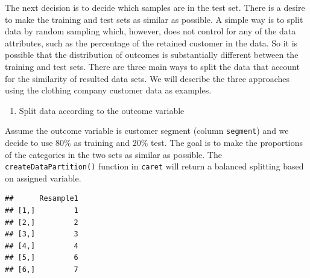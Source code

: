 \documentclass[12pt,]{krantz}
\makeatletter
\newenvironment{Shaded}{\begin{snugshade}}{\end{snugshade}}
\newcommand{\CommentTok}[1]{\textcolor[rgb]{0.37,0.37,0.37}{\textit{#1}}}
\newcommand{\DataTypeTok}[1]{\textcolor[rgb]{0.27,0.27,0.27}{#1}}
\newcommand{\DecValTok}[1]{\textcolor[rgb]{0.06,0.06,0.06}{#1}}
\newcommand{\FloatTok}[1]{\textcolor[rgb]{0.06,0.06,0.06}{#1}}
\newcommand{\KeywordTok}[1]{\textcolor[rgb]{0.27,0.27,0.27}{\textbf{#1}}}
\newcommand{\NormalTok}[1]{#1}
\newcommand{\OperatorTok}[1]{\textcolor[rgb]{0.43,0.43,0.43}{\textbf{#1}}}
\newcommand{\OtherTok}[1]{\textcolor[rgb]{0.37,0.37,0.37}{#1}}
\newcommand{\StringTok}[1]{\textcolor[rgb]{0.5,0.5,0.5}{#1}}
\providecommand{\tightlist}{%
  \setlength{\itemsep}{0pt}\setlength{\parskip}{0pt}}
\newenvironment{kframe}{%
\medskip{}
\setlength{\fboxsep}{.8em}
 \def\at@end@of@kframe{}%
 \ifinner\ifhmode%
  \def\at@end@of@kframe{\end{minipage}}%
  \begin{minipage}{\columnwidth}%
 \fi\fi%
 \def\FrameCommand##1{\hskip\@totalleftmargin \hskip-\fboxsep
 \colorbox{shadecolor}{##1}\hskip-\fboxsep
     \hskip-\linewidth \hskip-\@totalleftmargin \hskip\columnwidth}%
 \MakeFramed {\advance\hsize-\width
   \@totalleftmargin\z@ \linewidth\hsize
   \@setminipage}}%
 {\par\unskip\endMakeFramed%
 \at@end@of@kframe}
\renewenvironment{Shaded}{\begin{kframe}}{\end{kframe}}
\makeatother
\begin{document}
The next decision is to decide which samples are in the test set. There is a desire to make the training and test sets as similar as possible. A simple way is to split data by random sampling which, however, does not control for any of the data attributes, such as the percentage of the retained customer in the data. So it is possible that the distribution of outcomes is substantially different between the training and test sets. There are three main ways to split the data that account for the similarity of resulted data sets. We will describe the three approaches using the clothing company customer data as examples.

\begin{enumerate}
\def\labelenumi{(\arabic{enumi})}
\tightlist
\item
  Split data according to the outcome variable
\end{enumerate}

Assume the outcome variable is customer segment (column \texttt{segment}) and we decide to use 80\% as training and 20\% test. The goal is to make the proportions of the categories in the two sets as similar as possible. The \texttt{createDataPartition()} function in \texttt{caret} will return a balanced splitting based on assigned variable.

\begin{Shaded}
\end{Shaded}

\begin{verbatim}
##      Resample1
## [1,]         1
## [2,]         2
## [3,]         3
## [4,]         4
## [5,]         6
## [6,]         7
\end{verbatim}
\end{document}
